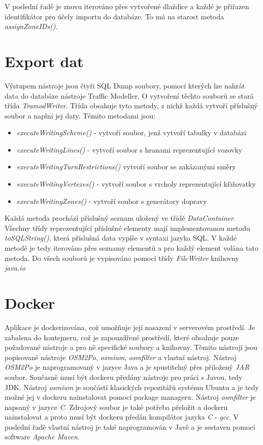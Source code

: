 V poslední řadě je znovu iterováno přes vytvořené dlaždice a každé je přiřazen identifikátor pro účely importu do databáze. To má na starost metoda \textit{assignZoneIDs()}.

\section{Export dat}

Výstupem nástroje jsou čtyři SQL Dump soubory, pomocí kterých lze nahrát data do databáze nástroje Traffic Modeller. O vytvoření těchto souborů se stará třída \textit{TramodWriter}. Třída obsahuje tyto metody, z nichž každá vytvoří příslušný soubor a naplní jej daty. Těmito metodami jsou: 

\begin{itemize}
  \item \textit{executeWritingScheme()} - vytvoří soubor, jenž vytvoří tabulky v databázi
	\item \textit{executeWritingLines()} - vytvoří soubor s hranami reprezentující vozovky
	\item \textit{executeWritingTurnRestrictions()} vytvoří soubor se zakázanými směry
	\item \textit{executeWritingVertexes()} - vytvoří soubor s vrcholy reprezentující křižovatky
	\item \textit{executeWritingZones()} - vytvoří soubor s generátory dopravy
\end{itemize}

Každá metoda prochází příslušný seznam uložený ve třídě \textit{DataContainer}. Všechny třídy reprezentující příslušné elementy mají implementovanou metodu \textit{toSQLString()}, která příslušná data vypíše v syntaxi jazyka SQL. V každé metodě je tedy iterováno přes seznamy elementů a pro každý element volána tato metoda. Do všech souborů je vypisováno pomocí třídy \textit{FileWriter} knihovny \textit{java.io}

\section{Docker}

Aplikace je dockerizována, což umožňuje její nasazení v serverovém prostředí. Je zabalena do kontejneru, což je zapouzdřené prostředí, které obsahuje pouze požadované nástroje a pro ně specifické soubory a knihovny. Těmito nástroji jsou popisované nástroje \textit{OSM2Po}, \textit{osmium}, \textit{osmfilter} a vlastní nástroj. Nástroj \textit{OSM2Po} je naprogramovaný v jazyce Java a je spustitelný přes přiložený \textit{JAR} soubor. Současně musí být dockeru předány nástroje pro práci s Javou, tedy JDK. Nástroj \textit{osmium} je součástí klasických repozitářů systému Ubuntu a je tedy možné jej v dockeru nainstalovat pomocí package manageru. Nástroj \textit{osmfilter} je napsaný v jazyce \textit{C}. Zdrojový soubor je také potřeba přeložit a dockeru nainstalovat a proto musí být dockeru předán kompilátor jazyka \textit{C} - \textit{gcc}. V poslední řadě vlastní nástroj je také naprogramován v Javě a je sestaven pomocí software \textit{Apache Maven}.

